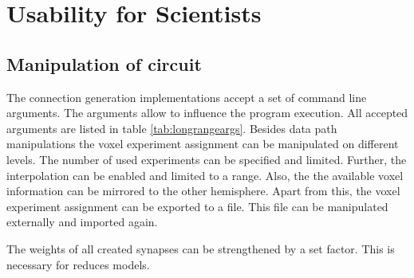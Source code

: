 




\newpage
\section{Usability for Scientists}

\subsection{Manipulation of circuit}

The connection generation implementations accept a set of command line arguments.
The arguments allow to influence the program execution.
All accepted arguments are listed in table \ref{tab:longrangeargs}.
Besides data path manipulations the voxel experiment assignment can be 
manipulated on different levels. The number of used experiments can be specified
and limited. Further, the interpolation can be enabled and limited to a range.
Also, the the available voxel information can be mirrored to the other hemisphere.
Apart from this, the voxel experiment assignment can be exported to a file.
This file can be manipulated externally and imported again.

The weights of all created synapses can be strengthened by a set factor.
This is necessary for reduces models.

